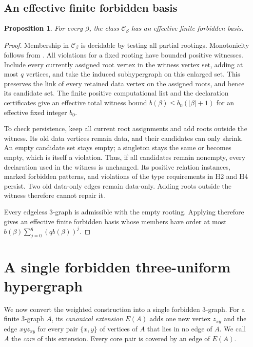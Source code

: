 \documentclass[10pt]{article}
\numberwithin{equation}{section}
\newtheorem{proposition}[proposition]{Proposition}\aliascntresetthe{proposition}
\theoremstyle{definition}
\begin{document}
\subsection{An effective finite forbidden basis}\label{sec:direct-finite-root-removal}

\begin{proposition}\label{prop:direct-finite-basis}
For every $\beta$, the class $\mathcal C_\beta$ has an effective finite forbidden basis.
\end{proposition}
\begin{proof}
Membership in $\mathcal C_\beta$ is decidable by testing all partial rootings. Monotonicity follows from . All violations for a fixed rooting have bounded positive witnesses. Include every currently assigned root vertex in the witness vertex set, adding at most $q$ vertices, and take the induced subhypergraph on this enlarged set. This preserves the link of every retained data vertex on the assigned roots, and hence its candidate set. The finite positive computational list and the declaration certificates give an effective total witness bound $b(\beta)\le b_0(|\beta|+1)$ for an effective fixed integer $b_0$.

To check persistence, keep all current root assignments and add roots outside the witness. Its old data vertices remain data, and their candidates can only shrink. An empty candidate set stays empty; a singleton stays the same or becomes empty, which is itself a violation. Thus, if all candidates remain nonempty, every declaration used in the witness is unchanged. Its positive relation instances, marked forbidden patterns, and violations of the type requirements in H2 and H4 persist. Two old data-only edges remain data-only. Adding roots outside the witness therefore cannot repair it.

Every edgeless $3$-graph is admissible with the empty rooting. Applying  therefore gives an effective finite forbidden basis whose members have order at most $b(\beta)\sum_{j=0}^q(qb(\beta))^j$.
\end{proof}

\section{A single forbidden three-uniform hypergraph}\label{sec:single}
We now convert the weighted construction into a single forbidden $3$-graph. For a finite $3$-graph $A$, its \emph{canonical extension} $E(A)$ adds one new vertex $z_{xy}$ and the edge $xyz_{xy}$ for every pair $\{x,y\}$ of vertices of $A$ that lies in no edge of $A$. We call $A$ the \emph{core} of this extension. Every core pair is covered by an edge of $E(A)$.
\end{document}
